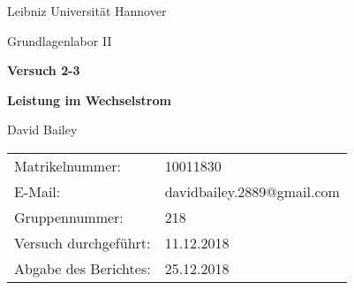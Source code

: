 \begin{titlepage}
	\centering
	{Leibniz Universität Hannover\par}
	{\large Grundlagenlabor II\par}	

	\vspace{4.5cm}	
	
	{\huge \bf Versuch 2-3 \par}
	{\Huge \bf Leistung im Wechselstrom\par}
	\vspace{0.3cm}
	
	\vspace{1.5cm}
	
	{\Large David Bailey\par}

	\vfill

	\raggedright

{\Large
\begin{tabular}{ll}
Matrikelnummer:& 10011830 \\
E-Mail: & davidbailey.2889@gmail.com \\
Gruppennummer:& 218 \\
Versuch durchgeführt:& 11.12.2018 \\
Abgabe des Berichtes:& 25.12.2018
\end{tabular}\par}

\end{titlepage}
